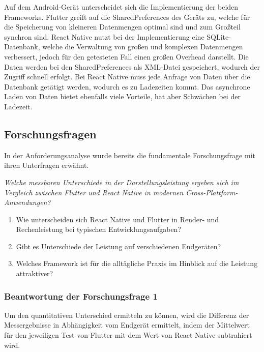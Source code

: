 Auf dem Android-Gerät unterscheidet sich die Implementierung der beiden Frameworks. Flutter greift auf die SharedPreferences des Geräts zu, welche für die Speicherung von kleineren Datenmengen optimal sind und zum Großteil synchron sind. React Native nutzt bei der Implementierung eine SQLite-Datenbank, welche die Verwaltung von großen und komplexen Datenmengen verbessert, jedoch für den getesteten Fall einen großen Overhead darstellt. Die Daten werden bei den SharedPreferences als XML-Datei gespeichert, wodurch der Zugriff schnell erfolgt. Bei React Native muss jede Anfrage von Daten über die Datenbank getätigt werden, wodurch es zu Ladezeiten kommt. Das asynchrone Laden von Daten bietet ebenfalls viele Vorteile, hat aber Schwächen bei der Ladezeit.

\newpage

\subsection{Forschungsfragen}
In der Anforderungsanalyse wurde bereits die fundamentale Forschungsfrage mit ihren Unterfragen erwähnt.

\vspace{0.5cm}

\textit{Welche messbaren Unterschiede in der Darstellungsleistung ergeben sich im Vergleich zwischen Flutter und React Native in modernen Cross-Plattform-Anwendungen?}


\begin{enumerate}
    \item Wie unterscheiden sich React Native und Flutter in Render- und Rechenleistung bei typischen Entwicklungsaufgaben?
    \item Gibt es Unterschiede der Leistung auf verschiedenen Endgeräten?
    \item Welches Framework ist für die alltägliche Praxis im Hinblick auf die Leistung attraktiver?
\end{enumerate}


\subsubsection{Beantwortung der Forschungsfrage 1}
Um den quantitativen Unterschied ermitteln zu können, wird die Differenz der Messergebnisse in Abhängigkeit vom Endgerät ermittelt, indem der Mittelwert für den jeweiligen Test von Flutter mit dem Wert von React Native subtrahiert wird.

